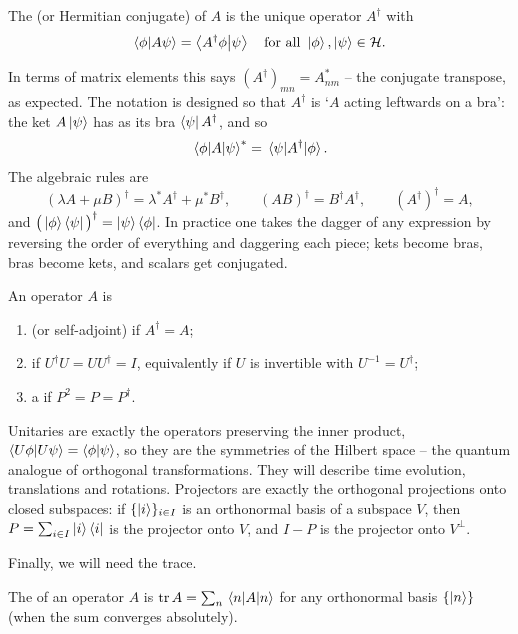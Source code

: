 \documentclass[a4paper]{scrartcl}
\begin{document}
\begin{definition}[Adjoint]
    The  (or Hermitian conjugate) of $A$ is the unique operator $A^\dagger$ with
    $$
    \braket{\phi}{A\psi} = \braket{A^\dagger \phi}{\psi} \quad \text{for all } \ket{\phi}, \ket{\psi} \in \mathcal{H}.
    $$
\end{definition}

In terms of matrix elements this says $(A^\dagger)_{mn} = A_{nm}^*$ -- the conjugate transpose, as expected. The notation is designed so that $A^\dagger$ is `$A$ acting leftwards on a bra': the ket $A\ket{\psi}$ has as its bra $\bra{\psi}A^\dagger$, and so
$$
\mel{\phi}{A}{\psi}^* = \mel{\psi}{A^\dagger}{\phi}.
$$
The algebraic rules are
$$
(\lambda A + \mu B)^\dagger = \lambda^* A^\dagger + \mu^* B^\dagger, \qquad (AB)^\dagger = B^\dagger A^\dagger, \qquad (A^\dagger)^\dagger = A,
$$
and $\big(\ket{\phi}\bra{\psi}\big)^\dagger = \ket{\psi}\bra{\phi}$. In practice one takes the dagger of any expression by reversing the order of everything and daggering each piece; kets become bras, bras become kets, and scalars get conjugated.

\begin{definition}
    An operator $A$ is
    \begin{enumerate}[label=(\roman*)]
        \item {} (or self-adjoint) if $A^\dagger = A$;
        \item {} if $U^\dagger U = U U^\dagger = I$, equivalently if $U$ is invertible with $U^{-1} = U^\dagger$;
        \item a  if $P^2 = P = P^\dagger$.
    \end{enumerate}
\end{definition}

Unitaries are exactly the operators preserving the inner product, $\braket{U\phi}{U\psi} = \braket{\phi}{\psi}$, so they are the symmetries of the Hilbert space -- the quantum analogue of orthogonal transformations. They will describe time evolution, translations and rotations. Projectors are exactly the orthogonal projections onto closed subspaces: if $\{\ket{i}\}_{i \in I}$ is an orthonormal basis of a subspace $V$, then $P = \sum_{i \in I}\ket{i}\bra{i}$ is the projector onto $V$, and $I - P$ is the projector onto $V^\perp$.

Finally, we will need the trace.

\begin{definition}[Trace]
    The  of an operator $A$ is $\tr A = \sum_n \mel{n}{A}{n}$ for any orthonormal basis $\{\ket{n}\}$ (when the sum converges absolutely).
\end{definition}
\end{document}
